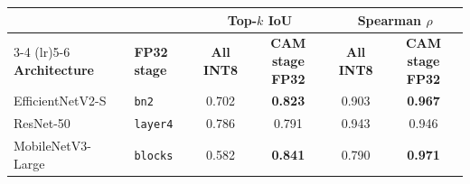 \begin{tabular}{ll cc cc}
\toprule
 & & \multicolumn{2}{c}{\textbf{Top-$k$ IoU}} & \multicolumn{2}{c}{\textbf{Spearman $\rho$}} \\
\cmidrule(lr){3-4} \cmidrule(lr){5-6}
\textbf{Architecture} & \textbf{FP32 stage} & \textbf{All INT8} & \textbf{CAM stage FP32} & \textbf{All INT8} & \textbf{CAM stage FP32} \\
\midrule
EfficientNetV2-S  & \texttt{bn2}   & 0.702 & \textbf{0.823} & 0.903 & \textbf{0.967} \\
ResNet-50         & \texttt{layer4} & 0.786 & 0.791 & 0.943 & 0.946 \\
MobileNetV3-Large & \texttt{blocks} & 0.582 & \textbf{0.841} & 0.790 & \textbf{0.971} \\
\bottomrule
\end{tabular}
